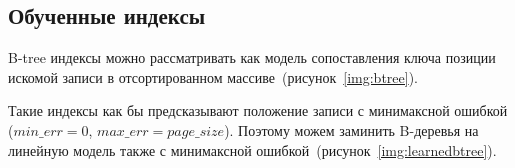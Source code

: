 %
%
%
%
%
%

\subsection{Обученные индексы}

B-tree индексы можно рассматривать как модель сопоставления ключа позиции
искомой записи в отсортированном массиве~(рисунок~\ref{img:btree}).


Такие индексы как бы предсказывают положение записи с минимаксной ошибкой
($min\_err = 0$, $max\_err = page\_size$). Поэтому можем заминить B-деревья на
линейную модель также с минимаксной ошибкой~(рисунок~\ref{img:learnedbtree}).

